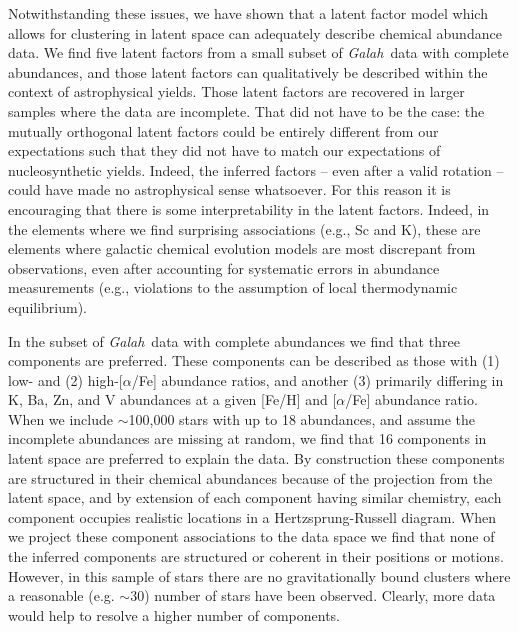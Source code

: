 \documentclass[twocolumn]{aastex62}
\newcommand{\project}[1]{\textsl{#1}}
\newcommand{\Galah}{\project{Galah}}
\begin{document}
Notwithstanding these issues, we have shown that a latent factor model which allows for clustering in latent space can adequately
describe chemical abundance data. 
We find five latent factors from a small subset of \Galah\ data with complete abundances, and
those latent factors can qualitatively be described within the context of astrophysical yields. 
Those latent factors are recovered in larger samples where the data are incomplete.
That did not have to be the case: the mutually orthogonal latent factors could be entirely 
different from our expectations such that they did not have to match our expectations of
nucleosynthetic yields. Indeed, the inferred factors -- even after a
valid rotation -- could have made no astrophysical sense whatsoever. For this reason it
is encouraging that there is some interpretability in the latent factors. Indeed, in the elements where we find surprising associations (e.g., Sc and K), these are elements where galactic chemical evolution models are most discrepant from observations, even after accounting for systematic errors in abundance measurements (e.g., violations to the assumption of local thermodynamic equilibrium).

In the subset of \Galah\ data with complete abundances we find that three components are
preferred. These components can be described as those with (1) low- and (2) high-[$\alpha$/Fe] abundance ratios, and another (3) primarily differing in K, Ba, Zn, and V abundances at a given [Fe/H] and [$\alpha$/Fe] abundance ratio. When we include $\sim$100,000 stars with up to 18 abundances, and assume the incomplete abundances are missing at random, we find that 16 components in latent space are preferred to explain the data. By construction these  components
are structured in their chemical abundances because of the projection from the latent
space, and by extension of each component having similar chemistry, each component
occupies realistic locations in a Hertzsprung-Russell diagram. When we
project these component associations to the data space we find that none of the inferred
components are structured or coherent in their positions or motions. However, in this sample of stars there are no gravitationally bound clusters where a reasonable (e.g. $\sim$30) number of stars have been observed. Clearly, more data would help to resolve a higher number of components.
\end{document}
